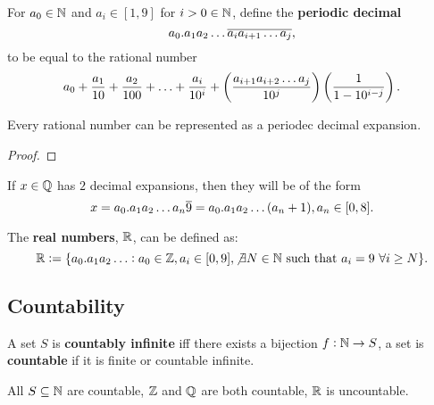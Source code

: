 \documentclass[../Year1.tex]{subfiles}
\begin{document}
\begingroup\belowdisplayskip=-0pt

\begin{definition}
    For $a_0\in\mathbb{N}$ and $a_i\in[1,9]$ for $i>0\in\mathbb{N}$, define the \textbf{periodic decimal} \[
        a_0.a_1a_2\ldots\overline{a_i a_{i+1}\ldots a_j}
    \textcolor{black}{,}
    \] to be equal to the rational number \[
        a_0 + \frac{a_1}{10} + \frac{a_2}{100} + \ldots + \frac{a_i}{10^i} + \br{\frac{a_{i+1}a_{i+2}\ldots a_j}{10^j}}\br{\frac{1}{1-10^{i-j}}}
    \textcolor{black}{.}
    \]
\end{definition}

\endgroup
\begingroup\belowdisplayskip=-10pt

\begin{theorem}
    Every rational number can be represented as a periodec decimal expansion.\begin{proof}
        
    \end{proof}
\end{theorem}

\begin{theorem}
    If $x\in\mathbb{Q}$ has $2$ decimal expansions, then they will be of the form \[
        x=a_0.a_1a_2\ldots a_n\overline{9} = a_0.a_1a_2\ldots(a_n+1), a_n\in[0,8]
    \textcolor{black}{.}    
    \]
\end{theorem}

\begin{definition}
    The \textbf{real numbers}, $\mathbb{R}$, can be defined as: \[
        \mathbb{R}:= \{a_0.a_1a_2\ldots : a_0\in\mathbb{Z}, a_i\in[0,9],\not\exists N\in\mathbb{N} \ \text{\textcolor{black}{such that }} a_i=9 \ \forall i\geq N\}
    \textcolor{black}{.}
    \]
\end{definition}

\endgroup

\subsection{Countability}

\begin{definition}[Countability]
    A set $S$ is \textbf{countably infinite} iff there exists a bijection $f:\mathbb{N}\rightarrow S$, a set is \textbf{countable} if it is finite or countable infinite.
\end{definition}

\begin{theorem}
    All $S\subseteq\mathbb{N}$ are countable, $\mathbb{Z}$ and $\mathbb{Q}$ are both countable, $\mathbb{R}$ is uncountable.
\end{theorem}
\end{document}

